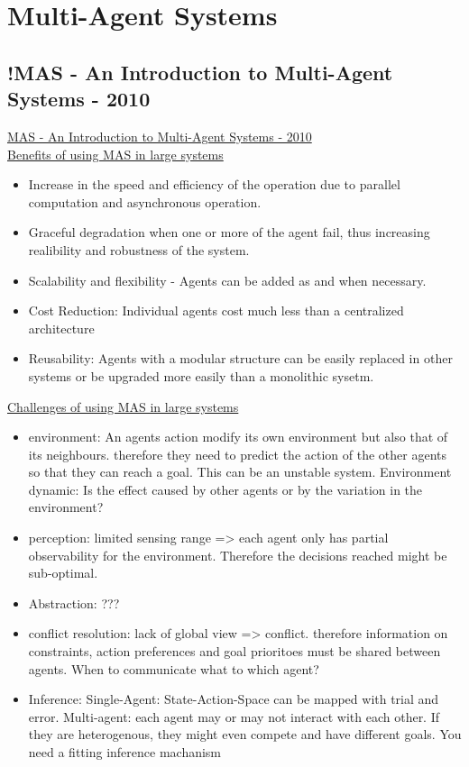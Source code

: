 \section{Multi-Agent Systems}
\subsection{!MAS - An Introduction to Multi-Agent Systems - 2010}
\href{https://link.springer.com/chapter/10.1007/978-3-642-14435-6_1}{MAS - An Introduction to Multi-Agent Systems - 2010}
\\
\underline{Benefits of using MAS in large systems}
\begin{itemize}[noitemsep,nolistsep]
	\item Increase in the speed and efficiency of the operation due to parallel computation and asynchronous operation.
	\item Graceful degradation when one or more of the agent fail, thus increasing realibility and robustness of the system.
	\item Scalability and flexibility - Agents can be added as and when necessary.
	\item Cost Reduction: Individual agents cost much less than a centralized architecture
	\item Reusability: Agents with a modular structure can be easily replaced in other systems or be upgraded more easily than a monolithic sysetm.
\end{itemize}
\underline{Challenges of using MAS in large systems}
\begin{itemize}[noitemsep,nolistsep]
	\item environment: An agents action modify its own environment but also that of its neighbours. therefore they need to predict the action of the other agents so that they can reach a goal. This can be an unstable system. Environment dynamic: Is the effect caused by other agents or by the variation in the environment?
	\item perception: limited sensing range => each agent only has partial observability for the environment. Therefore the decisions reached might be sub-optimal.
	\item Abstraction: ???
	\item conflict resolution: lack of global view => conflict. therefore information on constraints, action preferences and goal prioritoes must be shared between agents. When to communicate what to which agent?
	\item Inference: Single-Agent: State-Action-Space can be mapped with trial and error. Multi-agent: each agent may or may not interact with each other. If they are heterogenous, they might even compete and have different goals. You need a fitting inference machanism
\end{itemize}
